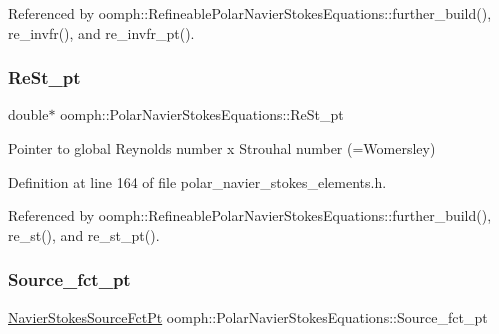 Referenced by oomph\+::\+Refineable\+Polar\+Navier\+Stokes\+Equations\+::further\+\_\+build(), re\+\_\+invfr(), and re\+\_\+invfr\+\_\+pt().

\mbox{\label{classoomph_1_1PolarNavierStokesEquations_a214463c8a9f3ea75dd68495d33906ff3}} 
\subsubsection{\texorpdfstring{Re\+St\+\_\+pt}{ReSt\_pt}}
{\footnotesize\ttfamily double$\ast$ oomph\+::\+Polar\+Navier\+Stokes\+Equations\+::\+Re\+St\+\_\+pt\hspace{0.3cm}{\ttfamily [protected]}}



Pointer to global Reynolds number x Strouhal number (=Womersley) 



Definition at line 164 of file polar\+\_\+navier\+\_\+stokes\+\_\+elements.\+h.



Referenced by oomph\+::\+Refineable\+Polar\+Navier\+Stokes\+Equations\+::further\+\_\+build(), re\+\_\+st(), and re\+\_\+st\+\_\+pt().

\mbox{\label{classoomph_1_1PolarNavierStokesEquations_ab33675bd49ce0e250e58e26cc02f920c}} 
\subsubsection{\texorpdfstring{Source\+\_\+fct\+\_\+pt}{Source\_fct\_pt}}
{\footnotesize\ttfamily \hyperlink{classoomph_1_1PolarNavierStokesEquations_a9084ecf962b26ccaa72443a807dedb25}{Navier\+Stokes\+Source\+Fct\+Pt} oomph\+::\+Polar\+Navier\+Stokes\+Equations\+::\+Source\+\_\+fct\+\_\+pt\hspace{0.3cm}{\ttfamily [protected]}}



